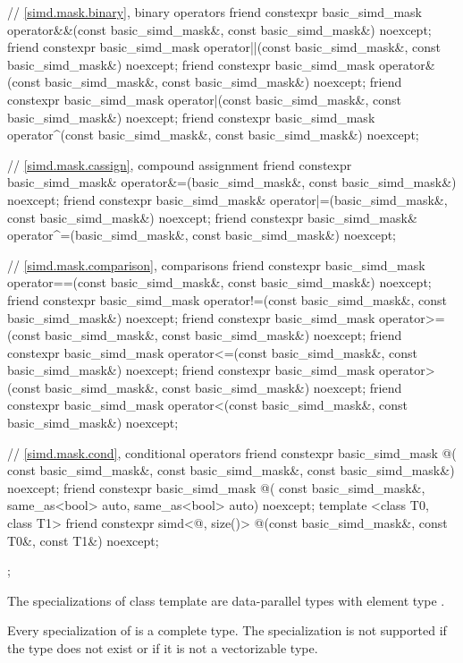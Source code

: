 \begin{codeblock}
{  // \ref{simd.mask.binary},  binary operators
  friend constexpr basic_simd_mask
    operator&&(const basic_simd_mask&, const basic_simd_mask&) noexcept;
  friend constexpr basic_simd_mask
    operator||(const basic_simd_mask&, const basic_simd_mask&) noexcept;
  friend constexpr basic_simd_mask
    operator&(const basic_simd_mask&, const basic_simd_mask&) noexcept;
  friend constexpr basic_simd_mask
    operator|(const basic_simd_mask&, const basic_simd_mask&) noexcept;
  friend constexpr basic_simd_mask
    operator^(const basic_simd_mask&, const basic_simd_mask&) noexcept;

  // \ref{simd.mask.cassign},  compound assignment
  friend constexpr basic_simd_mask&
    operator&=(basic_simd_mask&, const basic_simd_mask&) noexcept;
  friend constexpr basic_simd_mask&
    operator|=(basic_simd_mask&, const basic_simd_mask&) noexcept;
  friend constexpr basic_simd_mask&
    operator^=(basic_simd_mask&, const basic_simd_mask&) noexcept;

  // \ref{simd.mask.comparison},  comparisons
  friend constexpr basic_simd_mask
    operator==(const basic_simd_mask&, const basic_simd_mask&) noexcept;
  friend constexpr basic_simd_mask
    operator!=(const basic_simd_mask&, const basic_simd_mask&) noexcept;
  friend constexpr basic_simd_mask
    operator>=(const basic_simd_mask&, const basic_simd_mask&) noexcept;
  friend constexpr basic_simd_mask
    operator<=(const basic_simd_mask&, const basic_simd_mask&) noexcept;
  friend constexpr basic_simd_mask
    operator>(const basic_simd_mask&, const basic_simd_mask&) noexcept;
  friend constexpr basic_simd_mask
    operator<(const basic_simd_mask&, const basic_simd_mask&) noexcept;

  // \ref{simd.mask.cond},  conditional operators
  friend constexpr basic_simd_mask @\simdselect@(
    const basic_simd_mask&, const basic_simd_mask&, const basic_simd_mask&) noexcept;
  friend constexpr basic_simd_mask @\simdselect@(
    const basic_simd_mask&, same_as<bool> auto, same_as<bool> auto) noexcept;
  template <class T0, class T1>
    friend constexpr simd<@\seebelow@, size()>
      @\simdselect@(const basic_simd_mask&, const T0&, const T1&) noexcept;
};
\end{codeblock}

\pnum
The specializations of class template  are data-parallel types with element type .

\pnum
Every specialization of  is a complete type.
The specialization  is not supported if the type  does not exist or if it is not a vectorizable type.

